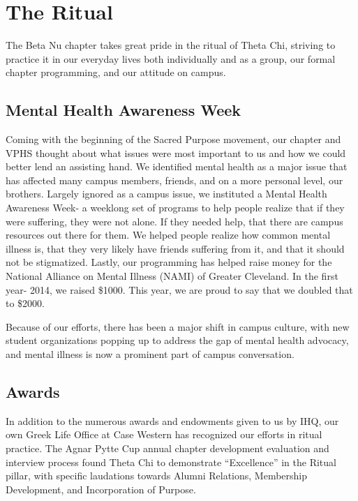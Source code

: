 \chapter{The Ritual}
  
  The Beta Nu chapter takes great pride in the ritual of Theta Chi, striving to practice it in our everyday lives both individually and as a group, our formal chapter programming, and our attitude on campus. 

  \section*{Mental Health Awareness Week}
    Coming with the beginning of the Sacred Purpose movement, our chapter and VPHS thought about what issues were most important to us and how we could better lend an assisting hand. We identified mental health as a major issue that has affected many campus members, friends, and on a more personal level, our brothers. Largely ignored as a campus issue, we instituted a Mental Health Awareness Week- a weeklong set of programs to help people realize that if they were suffering, they were not alone. If they needed help, that there are campus resources out there for them. We helped people realize how common mental illness is, that they very likely have friends suffering from it, and that it should not be stigmatized. Lastly, our programming has helped raise money for the National Alliance on Mental Illness (NAMI) of Greater Cleveland. In the first year- 2014, we raised \$1000. This year, we are proud to say that we doubled that to \$2000.
    
    Because of our efforts, there has been a major shift in campus culture, with new student organizations popping up to address the gap of mental health advocacy, and mental illness is now a prominent part of campus conversation.
    
  \section*{Awards}
    In addition to the numerous awards and endowments given to us by IHQ, our own Greek Life Office at Case Western has recognized our efforts in ritual practice. The Agnar Pytte Cup annual chapter development evaluation and interview process found Theta Chi to demonstrate “Excellence” in the Ritual pillar, with specific laudations towards Alumni Relations, Membership Development, and Incorporation of Purpose. \\
    
